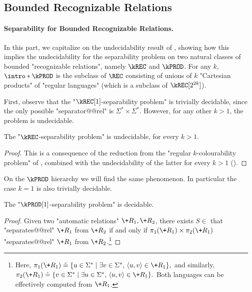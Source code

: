 \subsection{Bounded Recognizable Relations}
\AP\label{sec:dichotomy-bounded}

\paragraph*{Separability for Bounded Recognizable Relations.}

In this part, we capitalize on the undecidability result of , showing how this implies the undecidability for the separability problem on two natural classes of bounded "recognizable relations", namely $\kREC$ and $\kPROD$.
For any $k$, \AP$\intro*\kPROD$ is the subclass of $\REC$ consisting of unions of $k$ "Cartesian products" of "regular languages" (which is a subclass of $\kREC[2^{2k}]$).

First, observe that the "$\kREC[1]$-separability problem" is trivially decidable, since the only possible "separator@@rel" is $\Sigma^* \times \Sigma^*$. However, for any other $k>1$, the problem is undecidable.

\begin{corollary}
    \label{coro:krec-sep-undec}
    The "$\kREC$-separability problem" is undecidable, for every $k>1$.
\end{corollary}

\begin{proof}
    This is a consequence of the reduction from the "regular $k$-colourability problem" of , combined with the undecidability of the latter for every $k>1$ ().
\end{proof}

On the $\kPROD$ hierarchy we will find the same phenomenon. In particular the case $k=1$ is also trivially decidable.

\begin{proposition}
    The "$\kPROD[1]$-separability problem" is decidable.
\end{proposition}
\begin{proof}
    Given two "automatic relations" $\+R_1, \+R_2$, there exists $S \in $ \kPROD[1]
    that "separates@@rel" $\+R_1$ from $\+R_2$ if and only if $\pi_1(\+R_1)\times \pi_2(\+R_1)$
    "separates@@rel" $\+R_1$ from $\+R_2$.\footnote{Here,
    \(
        \pi_1(\+R_1) \defeq 
        \{u \in \Sigma^* \mid \exists v\in \Sigma^*,\,\tup{u,v} \in \+R_1\},
    \)
    and similarly,
    \(
        \pi_2(\+R_1) \defeq 
        \{v \in \Sigma^* \mid \exists u\in \Sigma^*,\,\tup{u,v} \in \+R_1\}.
    \)
    Both languages can be effectively computed from $\+R_1$.}
\end{proof}

